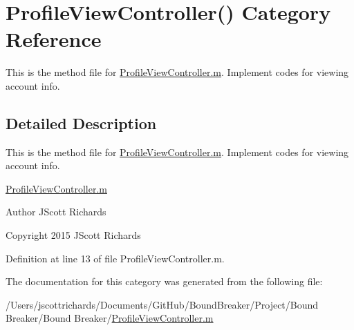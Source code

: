\hypertarget{category_profile_view_controller_07_08}{}\section{Profile\+View\+Controller() Category Reference}
\label{category_profile_view_controller_07_08}


This is the method file for \hyperlink{_profile_view_controller_8m}{Profile\+View\+Controller.\+m}. Implement codes for viewing account info.  




\subsection{Detailed Description}
This is the method file for \hyperlink{_profile_view_controller_8m}{Profile\+View\+Controller.\+m}. Implement codes for viewing account info. 

\hyperlink{_profile_view_controller_8m}{Profile\+View\+Controller.\+m}

\begin{DoxyAuthor}{Author}
J\+Scott Richards 
\end{DoxyAuthor}
\begin{DoxyCopyright}{Copyright}
2015 J\+Scott Richards 
\end{DoxyCopyright}


Definition at line 13 of file Profile\+View\+Controller.\+m.



The documentation for this category was generated from the following file\+:\begin{DoxyCompactItemize}
\item 
/\+Users/jscottrichards/\+Documents/\+Git\+Hub/\+Bound\+Breaker/\+Project/\+Bound Breaker/\+Bound Breaker/\hyperlink{_profile_view_controller_8m}{Profile\+View\+Controller.\+m}\end{DoxyCompactItemize}
